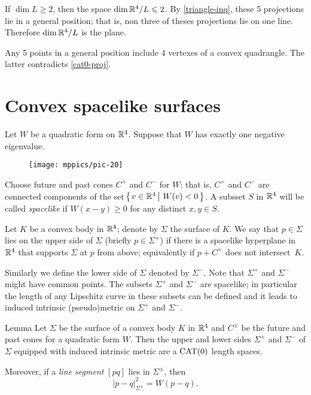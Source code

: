\documentclass{article}
\begin{document}
If $\dim L\ge 2$, then the space $\mathop{\rm dim}\nolimits \mathbb{R}^4/L\leqslant 2$.
By \ref{triangle-inq}, these 5 projections lie in a general position; that is, non three of theses projections lie on one line. 
Therefore $\mathop{\rm dim}\nolimits \mathbb{R}^4/L$ is the plane.

Any 5 points in a general position include 4 vertexes of a convex quadrangle.
The latter contradicts \ref{cat0-proj}.
\qeds

\section{Convex spacelike surfaces}

Let $W$ be a quadratic form on $\mathbb{R}^4$.
Suppose that  $W$ has exactly one negative eigenvalue.

\begin{wrapfigure}{r}{55mm}
\vskip-4mm
\centering
\texttt{[image: mppics/pic-20]}
\end{wrapfigure}

Choose future and past cones $C^+$ and $C^-$ for $W$;
that is, $C^+$ and $C^-$ are connected components of the set
$\set{v\in\RR^4}{W(v)< 0}$.
A subsset $S$ in $\mathbb{R}^4$ will be called \emph{spacelike} if $W(x-y)\ge 0$ for any distinct $x,y\in S$.

Let $K$ be a convex body in $\mathbb{R}^4$;
denote by $\Sigma$ the surface of $K$. 
We say that $p\in \Sigma$ lies on the upper side of $\Sigma$ (briefly $p\in\Sigma^+$) if there is a spacelike hyperplane in $\mathbb{R}^4$ that supports $\Sigma$ at $p$ from above;
equivalently if $p+C^+$ does not intersect~$K$.

Similarly we define the lower side of $\Sigma$ denoted by $\Sigma^-$.
Note that $\Sigma^+$ and $\Sigma^-$ might have common points.
The subsets $\Sigma^+$ and $\Sigma^-$ are spacelike;
in particular the length of any Lipschitz curve in these subsets can be defined and it leads to induced intrinsic (pseudo)metric on $\Sigma^+$ and $\Sigma^-$. 

\begin{thm}{Lemma}\label{lem:sides}
Let $\Sigma$ be the surface of a convex body $K$ in $\mathbb{R}^4$ and $C^\pm$ be the future and past cones for a quadratic form $W$.
Then the upper and lower sides $\Sigma^+$ and $\Sigma^-$ of $\Sigma$ equipped with induced intrinsic metric are a $\mathrm{CAT}(0)$ length spaces.

Moreover, if a \emph{line segment} $[pq]$ 
lies in $\Sigma^\pm$, then 
\[|p-q|_{\Sigma^\pm}^2=W(p-q).\]

\end{thm}
\end{document}
